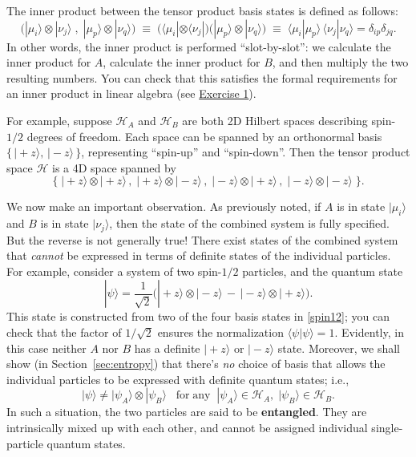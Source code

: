 \documentclass[pra,12pt]{revtex4}
\begin{document}
The inner product between the tensor product basis states is defined
as follows:
\begin{equation}
  \Big(|\mu_i\rangle \otimes |\nu_j\rangle\;,\; |\mu_p\rangle \otimes |\nu_q\rangle \Big) \;\equiv\; \Big(\langle\mu_i| \otimes \langle\nu_j| \Big) \Big(|\mu_p\rangle \otimes |\nu_q\rangle\Big) \;\equiv\; \langle\mu_i|\mu_p\rangle \, \langle\nu_j|\nu_q\rangle = \delta_{ip}\delta_{jq}.
\end{equation}
In other words, the inner product is performed ``slot-by-slot'': we
calculate the inner product for $A$, calculate the inner product for
$B$, and then multiply the two resulting numbers.  You can check that
this satisfies the formal requirements for an inner product in linear
algebra (see \hyperref[ex:innerprod]{Exercise 1}).

For example, suppose $\mathscr{H}_A$ and $\mathscr{H}_B$ are both 2D
Hilbert spaces describing spin-$1/2$ degrees of freedom.  Each space
can be spanned by an orthonormal basis $\{\,|\!+\!z\rangle,
\,|\!-\!z\rangle \, \}$, representing ``spin-up'' and ``spin-down''.
Then the tensor product space $\mathscr{H}$ is a 4D space spanned by
\begin{equation}
  \Big\{\;|\!+\!z\rangle\otimes|\!+\!z\rangle\,,\; |\!+\!z\rangle\otimes|\!-\!z\rangle\,,\; |\!-z\!\rangle\otimes|\!+\!z\rangle\,,\; |\!-\!z\rangle\otimes|\!-\!z\rangle \;\Big\}.
  \label{spin12}
\end{equation}

We now make an important observation.  As previously noted, if $A$ is
in state $|\mu_i\rangle$ and $B$ is in state $|\nu_j\rangle$, then the
state of the combined system is fully specified.  But the reverse is
not generally true!  There exist states of the combined system that
\textit{cannot} be expressed in terms of definite states of the
individual particles.  For example, consider a system of two
spin-$1/2$ particles, and the quantum state
\begin{equation}
  |\psi\rangle = \frac{1}{\sqrt{2}} \Big(|\!+\!z\rangle\otimes|\!-\!z\rangle \,-\, |\!-\!z\rangle\otimes|\!+\!z\rangle\Big).
\end{equation}
This state is constructed from two of the four basis states in
\eqref{spin12}; you can check that the factor of $1/\sqrt{2}$ ensures
the normalization $\langle\psi|\psi\rangle = 1$.  Evidently, in this
case neither $A$ nor $B$ has a definite $|\!+\!z\rangle$ or
$|\!-\!z\rangle$ state.  Moreover, we shall show (in
Section~\ref{sec:entropy}) that there's \textit{no} choice of basis
that allows the individual particles to be expressed with definite
quantum states; i.e.,
\begin{equation}
  |\psi\rangle \ne |\psi_A\rangle\otimes|\psi_B\rangle \;\;\;\textrm{for}\;\textrm{any}\;\; |\psi_A\rangle \in \mathscr{H}_A, \;|\psi_B\rangle \in \mathscr{H}_B.
\end{equation}
In such a situation, the two particles are said to be
\textbf{entangled}.  They are intrinsically mixed up with each other,
and cannot be assigned individual single-particle quantum states.
\end{document}
